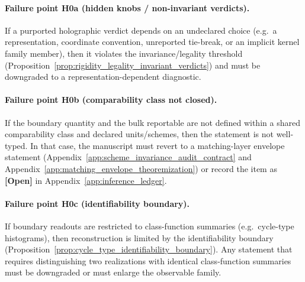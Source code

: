 \paragraph{Failure point H0a (hidden knobs / non-invariant verdicts).}
\AuditTag If a purported holographic verdict depends on an undeclared choice
(e.g.\ a representation, coordinate convention, unreported tie-break, or an implicit kernel family member),
then it violates the invariance/legality threshold (Proposition~\ref{prop:rigidity_legality_invariant_verdicts})
and must be downgraded to a representation-dependent diagnostic.

\paragraph{Failure point H0b (comparability class not closed).}
\AuditTag If the boundary quantity and the bulk reportable are not defined within a shared comparability class
and declared units/schemes, then the statement is not well-typed.
In that case, the manuscript must revert to a matching-layer envelope statement
(Appendix~\ref{app:scheme_invariance_audit_contract} and Appendix~\ref{app:matching_envelope_theoremization})
or record the item as \textbf{[Open]} in Appendix~\ref{app:inference_ledger}.

\paragraph{Failure point H0c (identifiability boundary).}
\AuditTag If boundary readouts are restricted to class-function summaries (e.g.\ cycle-type histograms),
then reconstruction is limited by the identifiability boundary
(Proposition~\ref{prop:cycle_type_identifiability_boundary}).
Any statement that requires distinguishing two realizations with identical class-function summaries
must be downgraded or must enlarge the observable family.

